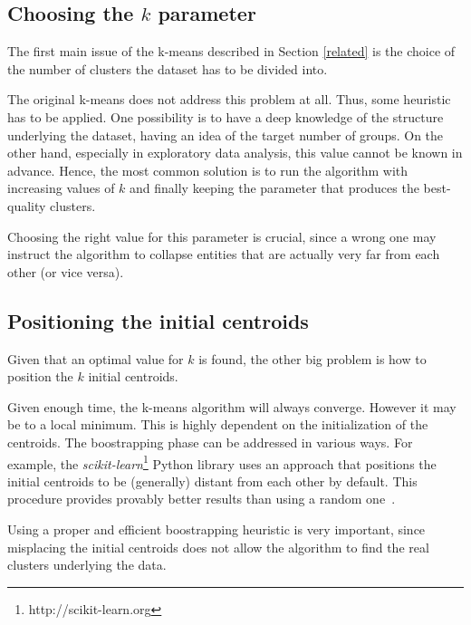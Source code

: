 \subsection*{Choosing the $k$ parameter}
The first main issue of the k-means described in Section \ref{related} is the choice
of the number of clusters the dataset has to be divided into.

The original k-means does not address this problem at all. Thus, some heuristic has to
be applied. One possibility is to have a deep knowledge of the structure underlying the
dataset, having an idea of the target number of groups. On the other hand, especially
in exploratory data analysis, this value cannot be known in advance.
Hence, the most common solution is to run the algorithm with increasing values of $k$ and
finally keeping the parameter that produces the best-quality clusters.

Choosing the right value for this parameter is crucial, since a wrong one may
instruct the algorithm to collapse entities that are actually very far from each other
(or vice versa).


\subsection*{Positioning the initial centroids}
Given that an optimal value for $k$ is found, the other big problem is how to position the $k$
initial centroids.

Given enough time, the k-means algorithm will always converge. However it may be to a local
minimum. This is highly dependent on the initialization of the centroids. The boostrapping
phase can be addressed in various ways. For example, the
\emph{scikit-learn}\footnote{http://scikit-learn.org} Python library
uses an approach that positions the initial centroids to be (generally) distant
from each other by default. This procedure provides provably better results than using a random
one~\cite{arthur2007k}.

Using a proper and efficient boostrapping heuristic is very important, since misplacing
the initial centroids does not allow the algorithm to find the real clusters underlying
the data.
